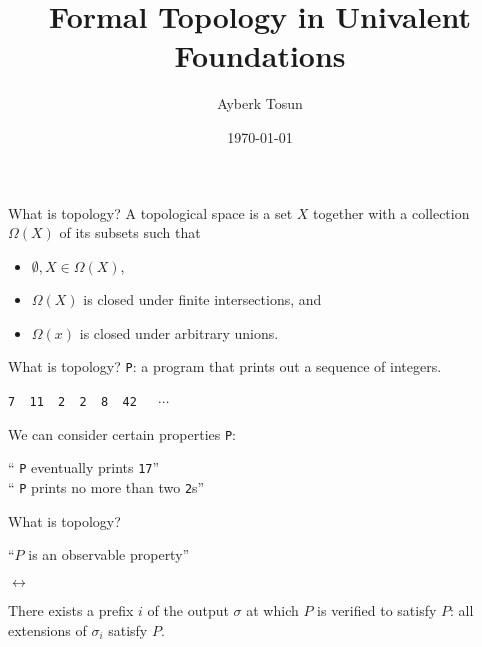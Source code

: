\documentclass[xcolor={dvipsnames}]{beamer}
\title{Formal Topology in Univalent Foundations}
\date{\today}
\author{Ayberk Tosun}
\institute{Chalmers University of Technology}
\newcommand{\fnname}[1]{{\color{codecolour} {\tt #1}}}
\newcommand{\prgoutput}[1]{{\color{codecolour} {\tt #1}}}
\begin{document}
\maketitle

\begin{frame}{What is topology?}
  \Large
  A topological space is a set $X$ together with a collection $\Omega(X)$ of its subsets
  such that
  \begin{itemize}
    \item $\emptyset, X \in \Omega(X)$,
    \item $\Omega(X)$ is closed under \alert{finite} intersections, and
    \item $\Omega(x)$ is closed under \alert{arbitrary} unions.
  \end{itemize}
\end{frame}

\begin{frame}{What is topology?}
  \Large
  \fnname{P}: a program that prints out a sequence of integers.

  \begin{center}
  \prgoutput{7~~11~~2~~2~~8~~42~~}~$\cdots$
  \end{center}

  We can consider certain properties \fnname{P}:
  \begin{center}
    ``\fnname{P} eventually prints \fnname{17}''\\
    \vspace{1em}
    ``\fnname{P} prints no more than two \fnname{2}s''
  \end{center}
\end{frame}

\begin{frame}{What is topology?}
  \Large
  \begin{center}
    ``$P$ is an \alert{observable property}''

    \vspace{2em}
    $\leftrightarrow$
    \vspace{2em}

    There exists a prefix $i$ of the output $\sigma$ at which $P$ is \alert{verified} to
    satisfy $P$: all extensions of $\sigma_i$ satisfy $P$.
  \end{center}
\end{frame}
\end{document}
